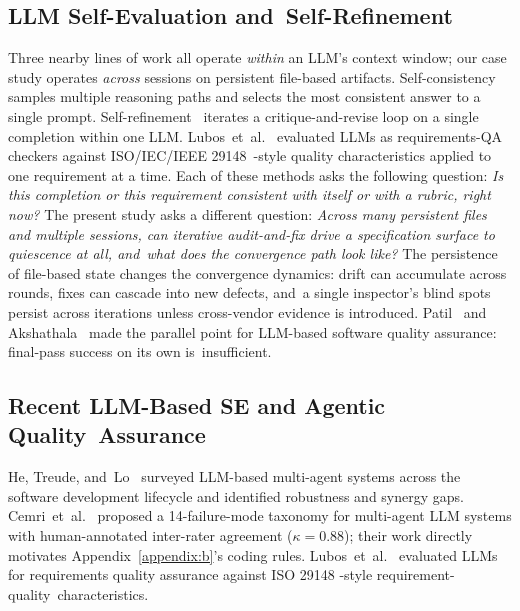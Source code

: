 \documentclass[software,article,accept,pdftex,oneauthor]{Definitions/mdpi}
\def\hl#1{#1}
\begin{document}
\subsection{LLM Self-Evaluation and~Self-Refinement}

Three nearby lines of work all operate \emph{\hl{within}} an LLM's context window; our case study operates \emph{\hl{across}} sessions on persistent file-based artifacts. Self-consistency~\cite{wang2023self} samples multiple reasoning paths and selects the most consistent answer to a single prompt. Self-refinement~\cite{madaan2023self} iterates a critique-and-revise loop on a single completion within one LLM. Lubos~et~al.~\cite{lubos2024llm_requirements_qa} evaluated LLMs as requirements-QA checkers against ISO/IEC/IEEE 29148~\cite{iso29148}-style quality characteristics applied to one requirement at a time. Each of these methods asks the following question: \emph{\hl{Is this completion or this requirement consistent with itself or with a rubric, right now?}} The present study asks a different question: \emph{\hl{Across many persistent files and multiple sessions, can iterative audit-and-fix drive a specification surface to quiescence at all, and~what does the convergence path look like?}} The persistence of file-based state changes the convergence dynamics: drift can accumulate across rounds, fixes can cascade into new defects, and~a single inspector's blind spots persist across iterations unless cross-vendor evidence is introduced. Patil~\cite{patil2025llm_sqa} and Akshathala~\cite{akshathala2025beyond_task_completion} made the parallel point for LLM-based software quality assurance: final-pass success on its own is~insufficient.

\subsection{Recent LLM-Based SE and Agentic Quality~Assurance}

He, Treude, and~Lo~\cite{he2024llm_multiagent} surveyed LLM-based multi-agent systems across the software development lifecycle and identified robustness and synergy gaps. Cemri~et~al.~\cite{cemri2025multiagent_fail} proposed a 14-failure-mode taxonomy for multi-agent LLM systems with human-annotated inter-rater agreement (\(\kappa = 0.88\)); their work directly motivates Appendix~\ref{appendix:b}'s coding rules. Lubos~et~al.~\cite{lubos2024llm_requirements_qa} evaluated LLMs for requirements quality assurance against \hl{ISO 29148}%
-style requirement-quality~characteristics.
\end{document}
